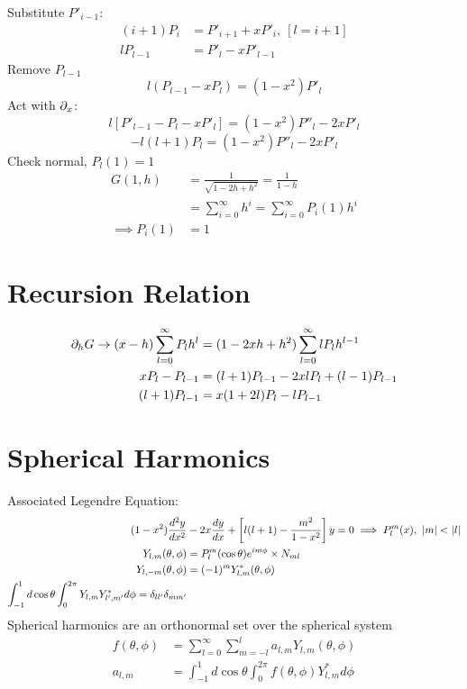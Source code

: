 \documentclass[Maths.tex]{subfiles}
\begin{document}
Substitute $P'_{i-1}$:
\begin{align*}
    (i+1)P_i &= P'_{i+1} + xP'_i,~ [l = i+1] \\
    lP_{l-1} &= P'_l - xP'_{l-1}
\end{align*}
Remove $P_{l-1}$
\begin{equation*}
    \boxed{l(P_{l-1} - xP_l) = (1-x^2)P'_l}
\end{equation*}
Act with $\partial_x$:
\begin{equation*}
    l[P'_{l-1}-P_l -xP'_l] = (1-x^2)P''_l - 2xP'_l
\end{equation*}
\begin{equation*}
    \boxed{-l(l+1)P_l = (1-x^2)P''_l - 2xP'_l}
\end{equation*}
Check normal, $P_l(1) = 1$
\begin{align*}
    G(1,h) &= \frac{1}{\sqrt{1-2h+h^2}} = \frac{1}{1-h} \\
    &= \sum_{i=0}^\infty h^i = \sum_{i=0}^\infty P_i(1)h^i \\
    \implies P_i(1) &= 1
\end{align*}

\section{Recursion Relation}
\begin{align*}
    \partial_hG \to (x-h)\sum_{l=0}^\infty P_lh^l &= (1-2xh+h^2)\sum_{l=0}^\infty lP_lh^{l-1} \\
    xP_l - P_{l-1} &= (l+1)P_{l-1} -2xlP_l + (l-1)P_{l-1} \\
    (l+1)P_{l-1} &= x(1+2l)P_l - lP_{l-1}
\end{align*}

\section{Spherical Harmonics}
Associated Legendre Equation:
\begin{align*}
    (1-x^2)\frac{d^2 y}{dx^2} &- 2x\frac{dy}{dx} + \left[l(l+1) - \frac{m^2}{1-x^2}\right]y = 0 \implies P_l^m(x),~ |m| < |l| \\
    Y_{l,m}(\theta,\phi) &= P_l^m(\cos\theta)e^{im\phi} \times N_{ml} \\
    Y_{l,-m}(\theta,\phi) &= (-1)^m Y_{l,m}^*(\theta,\phi) \\
    \int_{-1}^1 d\cos\theta \int_0^{2\pi} Y_{l,m}Y_{l',m'}^*d\phi = \delta_{ll'}\delta_{mm'}
\end{align*}
Spherical harmonics are an orthonormal set over the spherical system
\begin{align*}
    f(\theta,\phi) &= \sum_{l=0}^\infty \sum_{m=-l}^l a_{l,m}Y_{l,m}(\theta,\phi) \\
    a_{l,m} &= \int_{-1}^1 d\cos\theta \int_0^{2\pi} f(\theta,\phi)Y_{l,m}^*d\phi
\end{align*}
\end{document}
